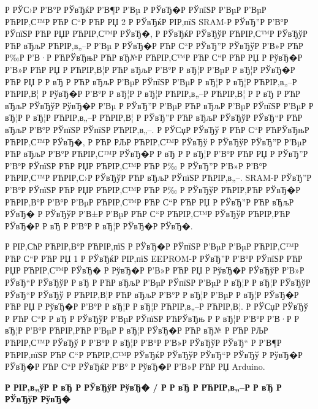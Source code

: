 \documentclass[a4paper,14pt]{extarticle}
\begin{document}
Р  РЎС›Р  Р’В°Р  РЎвЂќР  Р’В¶Р  Р’Вµ Р  РЎвЂ�Р  РЎпїЅР  Р’ВµР  Р’ВµР РЋРІР‚С™Р РЋР С“Р РЋР РЏ 2 Р  РЎвЂќР  РІР‚пїЅ SRAM-Р  РЎвЂ”Р  Р’В°Р  РЎпїЅР РЋР РЏР РЋРІР‚С™Р  РЎвЂ�, Р  РЎвЂќР  РЎвЂўР РЋРІР‚С™Р  РЎвЂўР РЋР вЂљР РЋРІР‚в„–Р  Р’Вµ Р  РЎвЂ�Р РЋР С“Р  РЎвЂ”Р  РЎвЂўР  Р’В»Р РЋР Р‰Р  Р’В·Р РЋРЎвЂњР РЋР вЂ№Р РЋРІР‚С™Р РЋР С“Р РЋР РЏ Р  РўвЂ�Р  Р’В»Р РЋР РЏ Р РЋРІР‚В¦Р РЋР вЂљР  Р’В°Р  Р вЂ¦Р  Р’ВµР  Р вЂ¦Р  РЎвЂ�Р РЋР РЏ Р  Р вЂ Р РЋР вЂљР  Р’ВµР  РЎпїЅР  Р’ВµР  Р вЂ¦Р  Р вЂ¦Р РЋРІР‚в„–Р РЋРІР‚В¦ Р  РўвЂ�Р  Р’В°Р  Р вЂ¦Р  Р вЂ¦Р РЋРІР‚в„–Р РЋРІР‚В¦ Р  Р вЂ Р РЋР вЂљР  РЎвЂўР  РўвЂ�Р  Р’Вµ Р  РЎвЂ”Р  Р’ВµР РЋР вЂљР  Р’ВµР  РЎпїЅР  Р’ВµР  Р вЂ¦Р  Р вЂ¦Р РЋРІР‚в„–Р РЋРІР‚В¦ Р  РЎвЂ”Р РЋР вЂљР  РЎвЂўР  РЎвЂ“Р РЋР вЂљР  Р’В°Р  РЎпїЅР  РЎпїЅР РЋРІР‚в„–. Р  РЎСџР  РЎвЂў Р РЋР С“Р РЋРЎвЂњР РЋРІР‚С™Р  РЎвЂ�, Р РЋР РЉР РЋРІР‚С™Р  РЎвЂў Р  РЎвЂўР  РЎвЂ”Р  Р’ВµР РЋР вЂљР  Р’В°Р РЋРІР‚С™Р  РЎвЂ�Р  Р вЂ Р  Р вЂ¦Р  Р’В°Р РЋР РЏ Р  РЎвЂ”Р  Р’В°Р  РЎпїЅР РЋР РЏР РЋРІР‚С™Р РЋР Р‰ Р  РЎвЂ”Р  Р’В»Р  Р’В°Р РЋРІР‚С™Р РЋРІР‚С›Р  РЎвЂўР РЋР вЂљР  РЎпїЅР РЋРІР‚в„–. SRAM-Р  РЎвЂ”Р  Р’В°Р  РЎпїЅР РЋР РЏР РЋРІР‚С™Р РЋР Р‰ Р  РЎвЂўР РЋРІР‚РЋР  РЎвЂ�Р РЋРІР‚В°Р  Р’В°Р  Р’ВµР РЋРІР‚С™Р РЋР С“Р РЋР РЏ Р  РЎвЂ”Р РЋР вЂљР  РЎвЂ� Р  РЎвЂўР  Р’В±Р  Р’ВµР РЋР С“Р РЋРІР‚С™Р  РЎвЂўР РЋРІР‚РЋР  РЎвЂ�Р  Р вЂ Р  Р’В°Р  Р вЂ¦Р  РЎвЂ�Р  РЎвЂ�.

Р  РІР‚СћР РЋРІР‚В°Р РЋРІР‚пїЅ Р  РЎвЂ�Р  РЎпїЅР  Р’ВµР  Р’ВµР РЋРІР‚С™Р РЋР С“Р РЋР РЏ 1 Р  РЎвЂќР  РІР‚пїЅ EEPROM-Р  РЎвЂ”Р  Р’В°Р  РЎпїЅР РЋР РЏР РЋРІР‚С™Р  РЎвЂ� Р  РўвЂ�Р  Р’В»Р РЋР РЏ Р  РўвЂ�Р  РЎвЂўР  Р’В»Р  РЎвЂ“Р  РЎвЂўР  Р вЂ Р РЋР вЂљР  Р’ВµР  РЎпїЅР  Р’ВµР  Р вЂ¦Р  Р вЂ¦Р  РЎвЂўР  РЎвЂ“Р  РЎвЂў Р РЋРІР‚В¦Р РЋР вЂљР  Р’В°Р  Р вЂ¦Р  Р’ВµР  Р вЂ¦Р  РЎвЂ�Р РЋР РЏ Р  РўвЂ�Р  Р’В°Р  Р вЂ¦Р  Р вЂ¦Р РЋРІР‚в„–Р РЋРІР‚В¦. Р  РЎСџР  РЎвЂў Р РЋР С“Р  Р вЂ Р  РЎвЂўР  Р’ВµР  РЎпїЅР РЋРЎвЂњ Р  Р вЂ¦Р  Р’В°Р  Р’В·Р  Р вЂ¦Р  Р’В°Р РЋРІР‚РЋР  Р’ВµР  Р вЂ¦Р  РЎвЂ�Р РЋР вЂ№ Р РЋР РЉР РЋРІР‚С™Р  РЎвЂў Р  Р’В°Р  Р вЂ¦Р  Р’В°Р  Р’В»Р  РЎвЂўР  РЎвЂ“ Р  Р’В¶Р РЋРІР‚пїЅР РЋР С“Р РЋРІР‚С™Р  РЎвЂќР  РЎвЂўР  РЎвЂ“Р  РЎвЂў Р  РўвЂ�Р  РЎвЂ�Р РЋР С“Р  РЎвЂќР  Р’В° Р  РўвЂ�Р  Р’В»Р РЋР РЏ Arduino.
\centerline{\large \bfseries Р  РІР‚в„ўР  Р вЂ Р  РЎвЂўР  РўвЂ� / Р  Р вЂ Р РЋРІР‚в„–Р  Р вЂ Р  РЎвЂўР  РўвЂ�}
\end{document}
